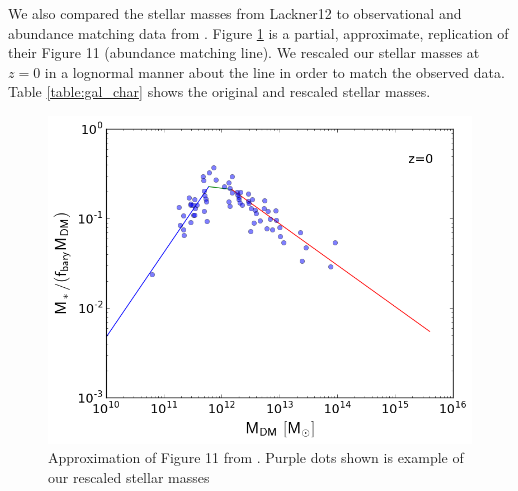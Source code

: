 \documentclass[english, apj]{emulateapj}
\begin{document}
We also compared the stellar masses from Lackner12 to  observational and abundance matching data from \citet{2018AstL...44....8K}. Figure \ref{fig:stellar1} is a partial, approximate, replication of their Figure 11 (abundance matching line).  We rescaled our stellar masses at $z=0$ in a lognormal manner about the line in order to match the observed data.  Table \ref{table:gal_char} shows the original and rescaled stellar masses.

\begin{figure}[htbp]
\begin{center}
\includegraphics[width=1.0\columnwidth]{plots/stellar_to_halo_ratio.png}
\caption{Approximation of Figure 11 from \citet{2018AstL...44....8K}.  Purple dots shown is example of our rescaled stellar masses}
\label{fig:stellar1}
\end{center}
\end{figure}
\end{document}
